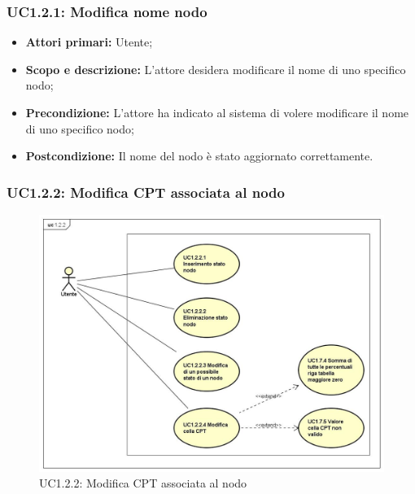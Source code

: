 \subsubsection{UC1.2.1: Modifica nome nodo} 
\begin{itemize} 
	\item{\textbf{Attori primari:} Utente;} 
	\item{\textbf{Scopo e descrizione:} L'attore desidera modificare il nome di uno specifico nodo;} 
	\item{\textbf{Precondizione:} L'attore ha indicato al sistema di volere modificare il nome di uno specifico nodo;} 
	\item{\textbf{Postcondizione:} Il nome del nodo è stato aggiornato correttamente.} 
\end{itemize} 
\subsubsection{UC1.2.2: Modifica CPT associata al nodo} 
\begin{figure} [H]
	\centering
	\includegraphics[scale=0.45]{Img/UC1-2-2} 
	\caption{UC1.2.2: Modifica CPT associata al nodo} \label{} 
\end{figure} 
